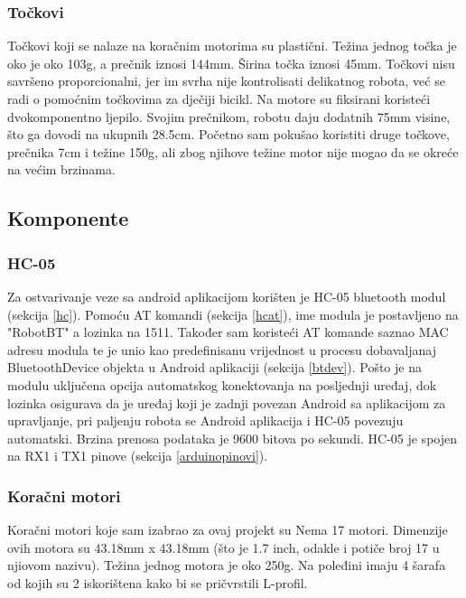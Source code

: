 \documentclass[../Document.tex]{subfiles}
\begin{document}
\subsubsection{Točkovi}
Točkovi koji se nalaze na koračnim motorima su plastični. Težina jednog točka je oko je oko 103g, a prečnik iznosi 144mm. Širina točka iznosi 45mm. Točkovi nisu savršeno proporcionalni, jer im svrha nije kontrolisati delikatnog robota, već se radi o pomoćnim točkovima za dječiji bicikl. Na motore su fiksirani koristeći dvokomponentno ljepilo. Svojim prečnikom, robotu daju dodatnih 75mm visine, što ga dovodi na ukupnih 28.5cm. Početno sam pokušao koristiti druge točkove, prečnika 7cm i težine 150g, ali zbog njihove težine motor nije mogao da se okreće na većim brzinama.

\subsection{Komponente}

\subsubsection{HC-05}
Za ostvarivanje veze sa android aplikacijom korišten je HC-05 bluetooth modul (sekcija \ref{hc}). Pomoću AT komandi (sekcija \ref{hcat}), ime modula je postavljeno na "RobotBT" a lozinka na 1511. Također sam koristeći AT komande saznao MAC adresu modula te je unio kao predefinisanu vrijednost u procesu dobavaljanaj BluetoothDevice objekta u Android aplikaciji (sekcija \ref{btdev}). Pošto je na modulu uključena opcija automatskog konektovanja na posljednji uređaj, dok lozinka osigurava da je uređaj koji je zadnji povezan Android sa aplikacijom za upravljanje, pri paljenju robota se Android aplikacija i HC-05 povezuju automatski. Brzina prenosa podataka je 9600 bitova po sekundi. HC-05 je spojen na RX1 i TX1 pinove (sekcija \ref{arduinopinovi}).

\subsubsection{Koračni motori}
Koračni motori koje sam izabrao za ovaj projekt su Nema 17 motori. Dimenzije ovih motora su 43.18mm x 43.18mm  (što je 1.7 inch, odakle i potiče broj 17 u njiovom nazivu). Težina jednog motora je oko 250g. Na poleđini imaju 4 šarafa od kojih su 2 iskorištena kako bi se pričvrstili L-profil.

\end{document}
